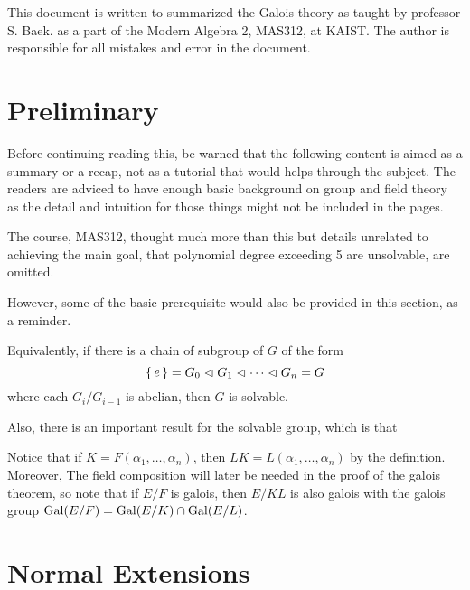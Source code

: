 \documentclass{article}
\begin{document}
  This document is written to summarized the Galois theory as taught by professor S. Baek. as a part of the Modern Algebra 2, MAS312, 
  at KAIST. The author is responsible for all mistakes and error in the document.

  \section*{Preliminary}
  Before continuing reading this, be warned that the following content is aimed as a summary or a recap, not as a tutorial that would 
  helps through the subject. The readers are adviced to have enough basic background on group and field theory as the detail and 
  intuition for those things might not be included in the pages.

  The course, MAS312, thought much more than this but details unrelated to achieving the main goal, that polynomial degree exceeding
  5 are unsolvable, are omitted.

  However, some of the basic prerequisite would also be provided in this section, as a reminder.

  
  Equivalently, if there is a chain of subgroup of $G$ of the form 
  \[ \left\{\, e \,\right\} = G_0 \vartriangleleft G_1 \vartriangleleft \cdots \vartriangleleft G_n = G \] where each $G_i/G_{i-1}$ is abelian, then $G$ is solvable.

  Also, there is an important result for the solvable group, which is that


  Notice that if $K = F(\alpha_1, \ldots, \alpha_n)$, then $LK = L(\alpha_1, \ldots, \alpha_n)$ by the definition. Moreover, 
  The field composition will later be needed in the proof of the galois theorem, so note that if $E/F$ is galois, then 
  $E/KL$ is also galois with the galois group $\operatorname{Gal}(E/F) = \operatorname{Gal}(E/K) \cap \operatorname{Gal}(E/L)$.

  \clearpage
  \section{Normal Extensions}
\end{document}
